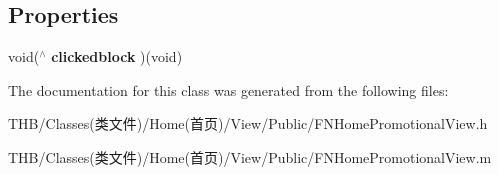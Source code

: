 \subsection*{Properties}
\begin{DoxyCompactItemize}
\item 
\mbox{\label{interface_f_n_home_promotional_view_a6924043d979f6488083c8adb4a03e279}} 
void($^\wedge$ {\bfseries clickedblock} )(void)
\end{DoxyCompactItemize}


The documentation for this class was generated from the following files\+:\begin{DoxyCompactItemize}
\item 
T\+H\+B/\+Classes(类文件)/\+Home(首页)/\+View/\+Public/F\+N\+Home\+Promotional\+View.\+h\item 
T\+H\+B/\+Classes(类文件)/\+Home(首页)/\+View/\+Public/F\+N\+Home\+Promotional\+View.\+m\end{DoxyCompactItemize}
